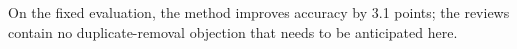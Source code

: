 On the fixed evaluation, the method improves accuracy by 3.1 points; the reviews contain no duplicate-removal objection that needs to be anticipated here.
